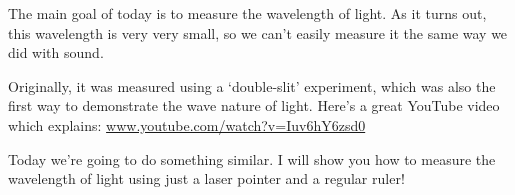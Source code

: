 \documentclass[12pt, letterpaper]{article}
\begin{document}
\normalsize


The main goal of today is to measure the wavelength of light. 
As it turns out, this wavelength is very very small, so we can't easily measure it the same way we did with sound.

Originally, it was measured using a `double-slit' experiment, which was also the first way to demonstrate the wave nature of light.
Here's a great YouTube video which explains:
\href{https://www.youtube.com/watch?v=Iuv6hY6zsd0}{www.youtube.com/watch?v=Iuv6hY6zsd0}

Today we're going to do something similar.
I will show you how to measure the wavelength of light using just a laser pointer and a regular ruler!
%
%
%
%
%
%
%
\end{document}
